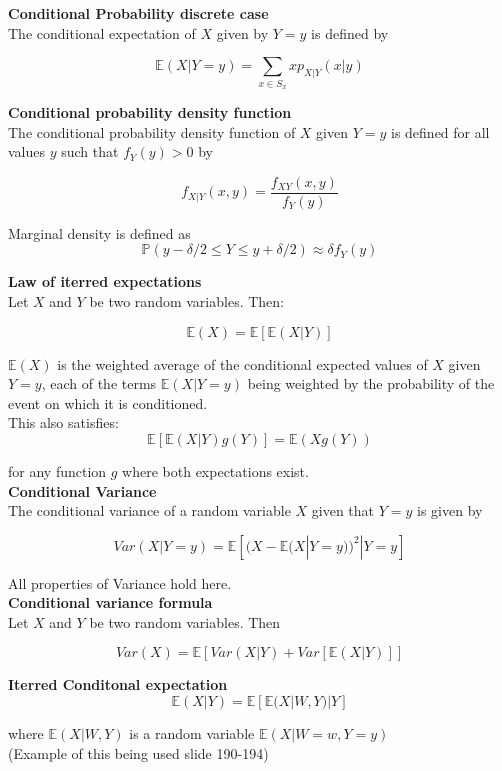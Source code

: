 \textbf{Conditional Probability discrete case}\\
The conditional expectation of $X$ given by $Y = y$ is defined by

$$\mathbb{E}(X|Y = y) = \sum_{x \in S_x} x p_{X|Y} (x|y)$$

\textbf{Conditional probability density function}\\

The conditional probability density function of $X$ given $Y = y$ is defined for all values $y$ such that $f_Y(y) > 0$ by 

$$f_{X|Y}(x,y) = \frac{f_{XY}(x,y)}{f_Y(y)}$$

Marginal density is defined as
$$\mathbb{P}(y-\delta/2 \leq Y \leq y + \delta/2) \approx \delta f_Y(y)$$

\textbf{Law of iterred expectations}\\
Let $X$ and $Y$ be two random variables. Then:

$$\mathbb{E}(X) = \mathbb{E}[\mathbb{E}(X|Y)]$$

$\mathbb{E}(X)$ is the weighted average of the conditional expected values of $X$ given $Y=y$, each of the terms $\mathbb{E}(X|Y=y)$ being weighted by the probability of the event on which it is conditioned.\\

This also satisfies:\\

$$\mathbb{E}[\mathbb{E}(X|Y)g(Y)] = \mathbb{E}(Xg(Y))$$

for any function $g$ where both expectations exist.\\

\textbf{Conditional Variance}\\
The conditional variance of a random variable $X$ given that $Y = y$ is given by

$$Var(X|Y=y) = \mathbb{E}[(X-\mathbb{E}(X|Y=y))^2|Y=y]$$

All properties of Variance hold here.\\

\textbf{Conditional variance formula}\\
Let $X$ and $Y$ be two random variables. Then

$$Var(X) = \mathbb{E}[Var(X|Y) + Var[\mathbb{E}(X|Y)]] $$

\textbf{Iterred Conditonal expectation}\\
$$\mathbb{E}(X|Y) = \mathbb{E}[\mathbb{E}(X|W,Y)|Y]$$

where $\mathbb{E}(X|W,Y)$ is a random variable $\mathbb{E}(X|W=w, Y=y)$\\

(Example of this being used slide 190-194) 